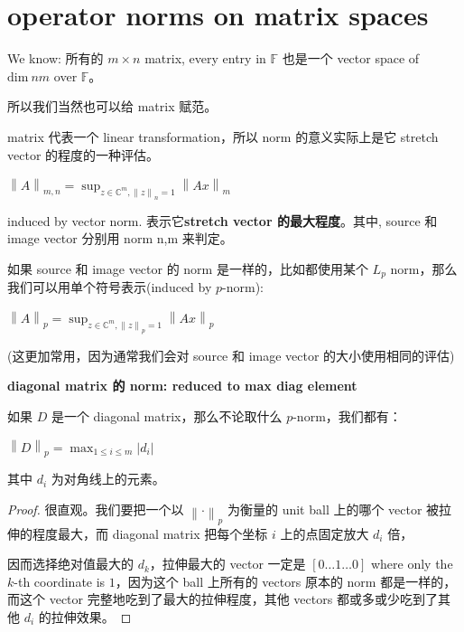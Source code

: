 \section{operator norms on matrix spaces}

We know: 所有的 \(m \times n\) matrix, every entry in \(\mathbb{F}\) 也是一个 vector space of \(\text{dim}\ nm\) over \(\mathbb{F}\)。

所以我们当然也可以给 matrix 赋范。

matrix 代表一个 linear transformation，所以 norm 的意义实际上是它 stretch vector 的程度的一种评估。

\begin{example}

\begin{definition}{}

\(\left\| A \right\|_{m,n} = \sup_{z \in \mathbb{C}^{m},{\| z\|}_{n} = 1}\left\| {Ax} \right\|_{m}\)

induced by vector norm. 表示它\textbf{stretch vector 的最大程度}。其中, source 和 image vector 分别用 norm n,m 来判定。

如果 source 和 image vector 的 norm 是一样的，比如都使用某个 \(L_{p}\) norm，那么我们可以用单个符号表示(induced by \(p\)-norm):

\(\left\| A \right\|_{p} = \sup_{z \in \mathbb{C}^{m},{\| z\|}_{p} = 1}\left\| {Ax} \right\|_{p}\)

(这更加常用，因为通常我们会对 source 和 image vector 的大小使用相同的评估)

\end{definition}

\begin{proposition}{\textbf{diagonal matrix 的 norm: reduced to max diag element}}

如果 \(D\) 是一个 diagonal matrix，那么不论取什么 \(p\)-norm，我们都有：

\(\left\| D \right\|_{p} = \max_{1 \leq i \leq m}\left| d_{i} \right|\)

其中 \(d_{i}\) 为对角线上的元素。

\end{proposition}

\begin{proof}

很直观。我们要把一个以 \(\left\| \cdot \right\|_{p}\) 为衡量的 unit ball 上的哪个 vector 被拉伸的程度最大，而 diagonal matrix 把每个坐标 \(i\) 上的点固定放大 \(d_{i}\) 倍，

因而选择绝对值最大的 \(d_{k}\)，拉伸最大的 vector 一定是 \(\left\lbrack {0\ldots 1\ldots 0} \right\rbrack\) where only the \(k\)-th coordinate is \(1\)，因为这个 ball 上所有的 vectors 原本的 norm 都是一样的，而这个 vector 完整地吃到了最大的拉伸程度，其他 vectors 都或多或少吃到了其他 \(d_{i}\) 的拉伸效果。


\end{proof}
\end{example}
